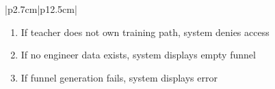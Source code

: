 \begin{table}[H]
\begin{tabular}{|p{2.7cm}|p{12.5cm}|}
\begin{minipage}[t]{\linewidth}
                                      \begin{enumerate}[topsep=0pt,itemsep=1pt,parsep=0pt,partopsep=0pt]
                                          \item If teacher does not own training path, system denies access
                                          \item If no engineer data exists, system displays empty funnel
                                          \item If funnel generation fails, system displays error
                                      \end{enumerate}
                                  \end{minipage} \\
        \hline
    \end{tabular}
    \label{tab:teacher-completion-funnel}
\end{table}





